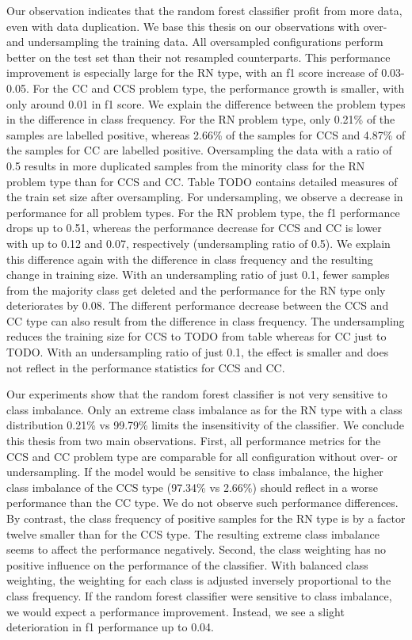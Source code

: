 Our observation indicates that the random forest classifier profit from more data, even with data duplication. We base this thesis on our observations with over- and undersampling the training data. All oversampled configurations perform better on the test set than their not resampled counterparts. This performance improvement is especially large for the RN type, with an f1 score increase of 0.03-0.05. For the CC and CCS problem type, the performance growth is smaller, with only around 0.01 in f1 score. We explain the difference between the problem types in the difference in class frequency. For the RN problem type, only 0.21\% of the samples are labelled positive, whereas 2.66\% of the samples for CCS and 4.87\% of the samples for CC are labelled positive. Oversampling the data with a ratio of 0.5 results in more duplicated samples from the minority class for the RN problem type than for CCS and CC. Table TODO contains detailed measures of the train set size after oversampling.
For undersampling, we observe a decrease in performance for all problem types. For the RN problem type, the f1 performance drops up to 0.51, whereas the performance decrease for CCS and CC is lower with up to 0.12 and 0.07, respectively (undersampling ratio of 0.5). We explain this difference again with the difference in class frequency and the resulting change in training size. With an undersampling ratio of just 0.1, fewer samples from the majority class get deleted and the performance for the RN type only deteriorates by 0.08.
The different performance decrease between the CCS and CC type can also result from the difference in class frequency. The undersampling reduces the training size for CCS to TODO from table whereas for CC just to TODO. With an undersampling ratio of just 0.1, the effect is smaller and does not reflect in the performance statistics for CCS and CC.



Our experiments show that the random forest classifier is not very sensitive to class imbalance. Only an extreme class imbalance as for the RN type with a class distribution 0.21\% vs 99.79\% limits the insensitivity of the classifier. We conclude this thesis from two main observations. 
First, all performance metrics for the CCS and CC problem type are comparable for all configuration without over- or undersampling. If the model would be sensitive to class imbalance, the higher class imbalance of the CCS type (97.34\% vs 2.66\%) should reflect in a worse performance than the CC type. We do not observe such performance differences. By contrast, the class frequency of positive samples for the RN type is by a factor twelve smaller than for the CCS type. The resulting extreme class imbalance seems to affect the performance negatively. 
Second, the class weighting has no positive influence on the performance of the classifier. With balanced class weighting, the weighting for each class is adjusted inversely proportional to the class frequency. If the random forest classifier were sensitive to class imbalance, we would expect a performance improvement. Instead, we see a slight deterioration in f1 performance up to 0.04.


